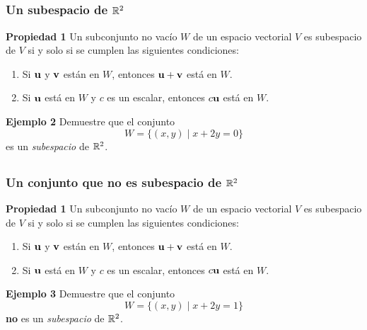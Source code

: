 
\subsection{}

\begin{frame}\frametitle{Un subespacio de $\mathbb{R}^2$}

\begin{prop}{\textbf{Propiedad 1}}
	\justifying
	Un subconjunto no vacío $W$ de un espacio vectorial $V$ es {\color{red} subespacio} 
	de $V$ si y solo si se cumplen las siguientes condiciones:
	\begin{enumerate}
		\item[\labelname{$a$}] Si $\mathbf{u}$ y $\mathbf{v}$ están en $W$, entonces $\mathbf{u}+\mathbf{v}$ está en $W$.
		\item[\labelname{$b$}] Si $\mathbf{u}$ está en $W$ y $c$ es un escalar, entonces $c\mathbf{u}$ está en $W$.
	\end{enumerate}
\end{prop}

\begin{ej}{\textbf{Ejemplo 2}}\justifying
	Demuestre que el conjunto 
	\[
	W = \{ (x,y) \mid x+2y=0 \}
	\]
	es un \textit{subespacio} de $\mathbb{R}^2$.
\end{ej}

\end{frame}


\subsection{}

\begin{frame}\frametitle{Un conjunto que no es subespacio de $\mathbb{R}^2$}

\begin{prop}{\textbf{Propiedad 1}}
	\justifying
	Un subconjunto no vacío $W$ de un espacio vectorial $V$ es {\color{red} subespacio} 
	de $V$ si y solo si se cumplen las siguientes condiciones:
	\begin{enumerate}
		\item[\labelname{$a$}] Si $\mathbf{u}$ y $\mathbf{v}$ están en $W$, entonces $\mathbf{u}+\mathbf{v}$ está en $W$.
		\item[\labelname{$b$}] Si $\mathbf{u}$ está en $W$ y $c$ es un escalar, entonces $c\mathbf{u}$ está en $W$.
	\end{enumerate}
\end{prop}

\begin{ej}{\textbf{Ejemplo 3}}\justifying
	Demuestre que el conjunto 
	\[
	W = \{ (x,y) \mid x+2y=1 \}
	\]
	\textbf{no} es un \textit{subespacio} de $\mathbb{R}^2$.
\end{ej}

\end{frame}

